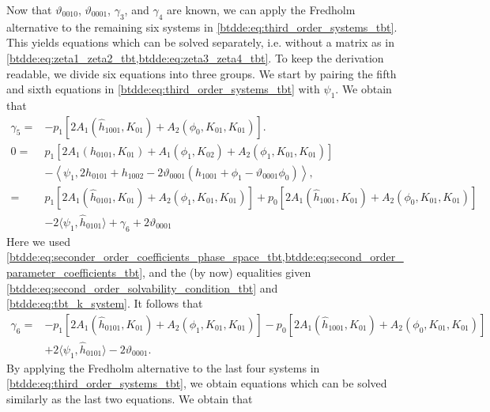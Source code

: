 Now that $\vartheta_{0010}$, $\vartheta_{0001}$, $\gamma_3$, and $\gamma_4$ are
known, we can apply the Fredholm alternative to the remaining six systems in
\cref{btdde:eq:third_order_systems_tbt}. This yields equations which can be solved
separately, i.e. without a matrix as in
\cref{btdde:eq:zeta1_zeta2_tbt,btdde:eq:zeta3_zeta4_tbt}. To keep the derivation readable,
we divide six equations into three groups. We start by pairing the fifth and
sixth equations in \cref{btdde:eq:third_order_systems_tbt} with $\psi_1$. We obtain that 
\begin{align*}
\gamma_5 ={}& -p_1\left[2 A_1(\hat h_{1001}, K_{01}) + A_2(\phi_0,K_{01},K_{01})\right]. \\
0 ={}& p_1 \left[2 A_1(h_{0101},K_{01}) + A_1(\phi_1,K_{02}) + A_2(\phi_1,K_{01},K_{01})\right] \\
     & -\left< \psi_1, 2 h_{0101} + h_{1002} - 2 \vartheta_{0001} (h_{1001} + \phi_1 - \vartheta_{0001} \phi_0) \right>, \\
  ={}& p_1 \left[2 A_1(\hat h_{0101},K_{01}) + A_2(\phi_1,K_{01},K_{01})\right]  
     + p_0 \left[2 A_1(\hat h_{1001},K_{01})+ A_2(\phi_0,K_{01},K_{01})\right] \\
     & -2 \langle \psi_1, \hat h_{0101} \rangle + \gamma_6 + 2 \vartheta_{0001}
\end{align*}
Here we used
\cref{btdde:eq:seconder_order_coefficients_phase_space_tbt,btdde:eq:second_order_parameter_coefficients_tbt},
and the (by now) equalities given \cref{btdde:eq:second_order_solvability_condition_tbt} and 
\cref{btdde:eq:tbt_k_system}. It follows that 
\begin{equation}
\begin{aligned}
\gamma_6 ={}& -p_1 \left[2 A_1(\hat h_{0101},K_{01}) + A_2(\phi_1,K_{01},K_{01})\right]  
              - p_0 \left[2 A_1(\hat h_{1001},K_{01})+ A_2(\phi_0,K_{01},K_{01})\right] \\
            & +2 \langle \psi_1, \hat h_{0101} \rangle - 2 \vartheta_{0001}. \nonumber
\end{aligned}
\end{equation}
%
By applying the Fredholm alternative to the last four systems in
\cref{btdde:eq:third_order_systems_tbt}, we obtain equations which can be solved 
similarly as the last two equations. We obtain that
